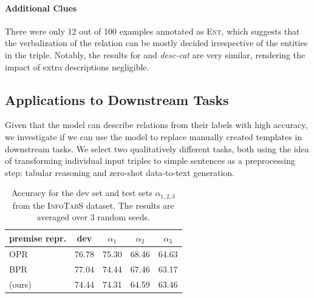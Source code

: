 \paragraph{Additional Clues} There were only 12 out of 100 examples annotated as \textsc{Ent}, which suggests that the verbalization of the relation can be mostly decided irrespective of the entities in the triple. Notably, the results for \BARTr{} and \textit{desc-cat} are very similar, rendering the impact of extra descriptions negligible.


\subsection{Applications to Downstream Tasks}
\label{sec:rel2text:downstream}
Given that the \BARTr{} model can describe relations from their labels with high accuracy, we investigate if we can use the model to replace manually created templates in downstream tasks. We select two qualitatively different tasks, both using the idea of transforming individual input triples to simple sentences as a preprocessing step: tabular reasoning and zero-shot data-to-text generation.


\begin{table}[t]\centering
    \small
    \setlength{\tabcolsep}{4pt}
    \begin{tabular}{lcccc}\toprule
        \textbf{premise repr.}              & \textbf{dev} & $\alpha_1$ & $\alpha_2$ & $\alpha_3$ \\\midrule
        OPR \cite{gupta2020infotabs}        & 76.78        & 75.30      & 68.46      & 64.63      \\
        BPR \cite{neeraja2021incorporating} & 77.04        & 74.44      & 67.46      & 63.17      \\
        \BARTr{} (ours)                     & 74.44        & 74.31      & 64.59      & 63.46      \\
        \bottomrule
    \end{tabular}
    \caption{Accuracy for the dev set and test sets  $\alpha_{1,2,3}$ from the \textsc{InfoTabS} dataset. The results are averaged over 3 random seeds.}
    \label{tab:rel2text:nli}
\end{table}


